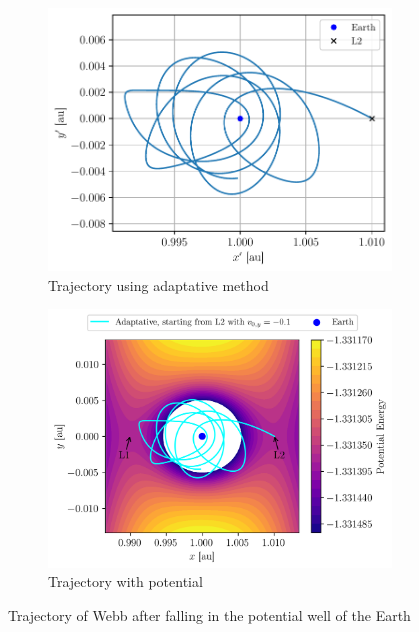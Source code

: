 \begin{figure}[h]
    \centering
    \begin{subfigure}{0.46\linewidth}
        \centering
        \includegraphics[width=\linewidth]{figures/lagrange_trajectory.pdf}
        \caption{Trajectory using adaptative method}
        \label{fig:lagrange_trajectory}
    \end{subfigure}
    \begin{subfigure}{0.53\linewidth}
        \centering
        \includegraphics[width=\linewidth]{figures/potential_L1_L2_zoom_trajectory.png}
        \caption{Trajectory with potential}
        \label{fig:lagrange_trajectory_potential}
    \end{subfigure}
    \caption{Trajectory of Webb after falling in the potential well of the Earth}
\end{figure}

